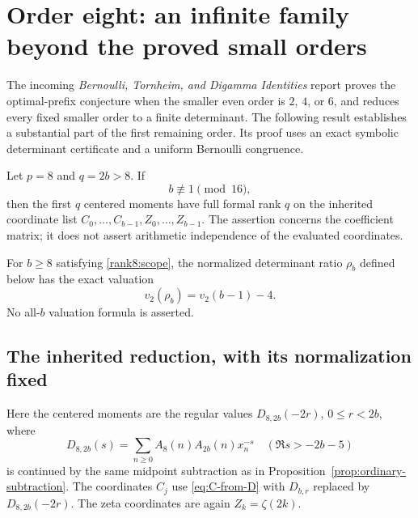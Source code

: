 \section{Order eight: an infinite family beyond the proved small orders}
\label{rank8:section}

The incoming \emph{Bernoulli, Tornheim, and Digamma Identities} report
\cite[general small-determinant reduction and research question R1]{incoming-bernoulli}
proves the optimal-prefix conjecture when the smaller even order is
$2$, $4$, or $6$, and reduces every fixed smaller order to a finite
determinant.  The following result establishes a substantial part of
the first remaining order.  Its proof uses an exact symbolic
determinant certificate and a uniform Bernoulli congruence.

\begin{theorem}
\label{rank8:theorem}
Let $p=8$ and $q=2b>8$.  If
\begin{equation}\label{rank8:scope}
 b\not\equiv1\pmod {16},
\end{equation}
then the first $q$ centered moments have full formal rank $q$ on
the inherited coordinate list
$C_0,\ldots,C_{b-1},Z_0,\ldots,Z_{b-1}$.
The assertion concerns the coefficient matrix; it does not assert
arithmetic independence of the evaluated coordinates.

For $b\ge8$ satisfying \eqref{rank8:scope}, the normalized determinant
ratio $\rho_b$ defined below has the exact valuation
\begin{equation}\label{rank8:valuation}
 v_2(\rho_b)=v_2(b-1)-4.
\end{equation}
No all-$b$ valuation formula is asserted.
\end{theorem}

\subsection{The inherited reduction, with its normalization fixed}

Here the centered moments are the regular values
$D_{8,2b}(-2r)$, $0\le r<2b$, where
\[
 D_{8,2b}(s)=\sum_{n\ge0}A_8(n)A_{2b}(n)x_n^{-s}
 \quad(\Re s>-2b-5)
\]
is continued by the same midpoint subtraction as in
Proposition~\ref{prop:ordinary-subtraction}. The coordinates $C_j$
use \eqref{eq:C-from-D} with $D_{b,r}$ replaced by $D_{8,2b}(-2r)$.
The zeta coordinates are again $Z_k=\zeta(2k)$.

